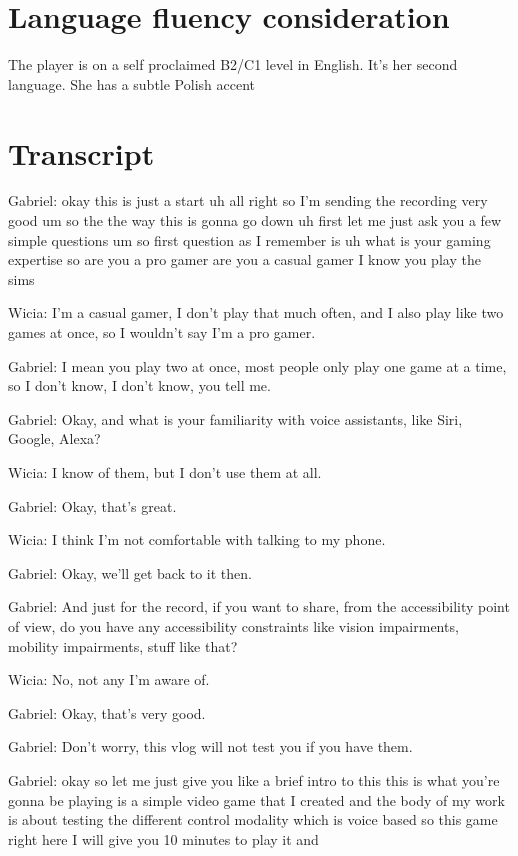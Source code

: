 \section{Language fluency consideration}


The player is on a self proclaimed B2/C1 level in English. It's her second language. She has a subtle Polish accent

\section{Transcript}

Gabriel: okay this is just a start uh all right so I'm sending the recording very good um so the the way this is gonna go down uh first let me just ask you a few simple questions um so first question as I remember is uh what is your gaming expertise so are you a pro gamer are you a casual gamer I know you play the sims

Wicia: I'm a casual gamer, I don't play that much often, and I also play like two games at once, so I wouldn't say I'm a pro gamer.

Gabriel: I mean you play two at once, most people only play one game at a time, so I don't know, I don't know, you tell me.

Gabriel: Okay, and what is your familiarity with voice assistants, like Siri, Google, Alexa?

Wicia: I know of them, but I don't use them at all.

Gabriel: Okay, that's great.

Wicia: I think I'm not comfortable with talking to my phone.

Gabriel: Okay, we'll get back to it then.

Gabriel: And just for the record, if you want to share, from the accessibility point of view, do you have any accessibility constraints like vision impairments, mobility impairments, stuff like that?

Wicia: No, not any I'm aware of.

Gabriel: Okay, that's very good.

Gabriel: Don't worry, this vlog will not test you if you have them.

Gabriel: okay so let me just give you like a brief intro to this this is what you're gonna be playing is a simple video game that I created and the body of my work is about testing the different control modality which is voice based so this game right here I will give you 10 minutes to play it and

